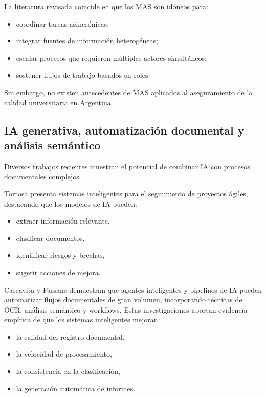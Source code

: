 \documentclass[12pt]{article}
\let\cite\citep
\begin{document}
La literatura revisada coincide en que los MAS son idóneos para:

\begin{itemize}
    \item coordinar tareas asincrónicas;
    \item integrar fuentes de información heterogéneas;
    \item escalar procesos que requieren múltiples actores simultáneos;
    \item sostener flujos de trabajo basados en roles.
\end{itemize}

Sin embargo, no existen antecedentes de MAS aplicados al aseguramiento de la calidad universitaria en Argentina.

\subsection{IA generativa, automatización documental y análisis semántico}

Diversos trabajos recientes muestran el potencial de combinar IA con procesos documentales complejos.

Tortosa \cite{tortosasistemas} presenta sistemas inteligentes para el seguimiento de proyectos ágiles, destacando que los modelos de IA pueden:

\begin{itemize}
    \item extraer información relevante,
    \item clasificar documentos,
    \item identificar riesgos y brechas,
    \item sugerir acciones de mejora.
\end{itemize}

Cascavita \cite{cascavita2025sistema} y Farsane \cite{farsane2025automatizacion} demuestran que agentes inteligentes y pipelines de IA pueden automatizar flujos documentales de gran volumen, incorporando técnicas de OCR, análisis semántico y workflows.  
Estas investigaciones aportan evidencia empírica de que los sistemas inteligentes mejoran:

\begin{itemize}
    \item la calidad del registro documental,
    \item la velocidad de procesamiento,
    \item la consistencia en la clasificación,
    \item la generación automática de informes.
\end{itemize}
\end{document}
